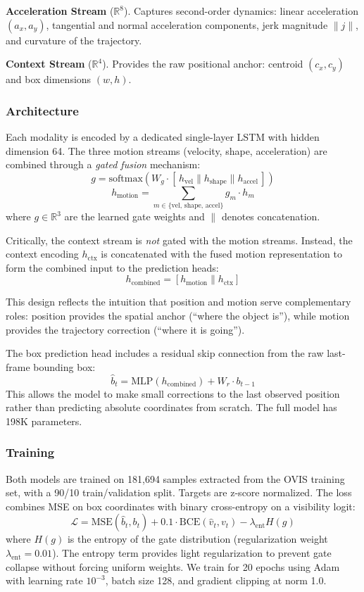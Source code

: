 \documentclass{article}
\begin{document}
\textbf{Acceleration Stream} ($\mathbb{R}^{8}$). Captures second-order dynamics: linear acceleration $(a_x, a_y)$, tangential and normal acceleration components, jerk magnitude $\|j\|$, and curvature of the trajectory.

\textbf{Context Stream} ($\mathbb{R}^{4}$). Provides the raw positional anchor: centroid $(c_x, c_y)$ and box dimensions $(w, h)$.

\subsubsection{Architecture}

Each modality is encoded by a dedicated single-layer LSTM with hidden dimension 64. The three motion streams (velocity, shape, acceleration) are combined through a \emph{gated fusion} mechanism:
\[
g = \text{softmax}(W_g \cdot [\,h_\text{vel} \| h_\text{shape} \| h_\text{accel}\,])
\]
\[
h_\text{motion} = \sum_{m \in \{\text{vel, shape, accel}\}} g_m \cdot h_m
\]
where $g \in \mathbb{R}^3$ are the learned gate weights and $\|$ denotes concatenation.

Critically, the context stream is \emph{not} gated with the motion streams. Instead, the context encoding $h_\text{ctx}$ is concatenated with the fused motion representation to form the combined input to the prediction heads:
\[
h_\text{combined} = [h_\text{motion} \| h_\text{ctx}]
\]

This design reflects the intuition that position and motion serve complementary roles: position provides the spatial anchor (``where the object is''), while motion provides the trajectory correction (``where it is going'').

The box prediction head includes a residual skip connection from the raw last-frame bounding box:
\[
\hat{b}_t = \text{MLP}(h_\text{combined}) + W_r \cdot b_{t-1}
\]
This allows the model to make small corrections to the last observed position rather than predicting absolute coordinates from scratch. The full model has 198K parameters.

\subsubsection{Training}

Both models are trained on 181,694 samples extracted from the OVIS training set, with a 90/10 train/validation split. Targets are z-score normalized. The loss combines MSE on box coordinates with binary cross-entropy on a visibility logit:
\[
\mathcal{L} = \text{MSE}(\hat{b}_t, b_t) + 0.1 \cdot \text{BCE}(\hat{v}_t, v_t) - \lambda_{\text{ent}} H(g)
\]
where $H(g)$ is the entropy of the gate distribution (regularization weight $\lambda_{\text{ent}} = 0.01$). The entropy term provides light regularization to prevent gate collapse without forcing uniform weights. We train for 20 epochs using Adam with learning rate $10^{-3}$, batch size 128, and gradient clipping at norm 1.0.
\end{document}
